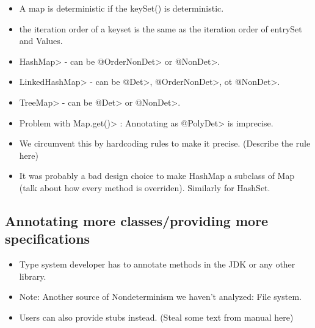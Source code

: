 \begin{itemize}
	\item A map is deterministic if the keySet() is deterministic.
	\item the iteration order of a keyset is the same as the iteration order of entrySet and Values.
	\item \<HashMap> - can be \<@OrderNonDet> or \<@NonDet>.
	\item \<LinkedHashMap> - can be \<@Det>, \<@OrderNonDet>, ot \<@NonDet>.
	\item \<TreeMap> - can be \<@Det> or \<@NonDet>.
	\item Problem with \<Map.get()> : Annotating as \<@PolyDet> is imprecise.
	\item We circumvent this by hardcoding rules to make it precise. (Describe the rule here)
	\item It was probably a bad design choice to make HashMap a subclass of Map (talk about how
	every method is overriden). Similarly for HashSet.
\end{itemize}

\subsection{Annotating more classes/providing more specifications}
\begin{itemize}
	\item Type system developer has to annotate methods in the JDK or any other library.
	\item Note: Another source of Nondeterminism we haven't analyzed: File system.
	\item Users can also provide stubs instead. (Steal some text from manual here)
\end{itemize}
